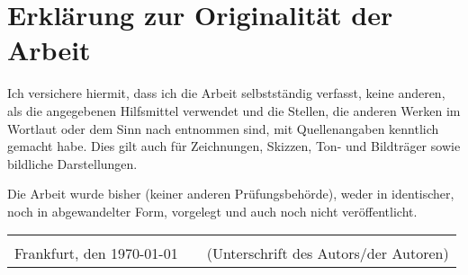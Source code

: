 \chapter*{Erklärung zur Originalität der Arbeit}
Ich versichere hiermit, dass ich die Arbeit selbstständig verfasst, keine anderen, als die angegebenen Hilfsmittel verwendet und die Stellen, die anderen Werken im Wortlaut oder dem Sinn nach entnommen sind, mit Quellenangaben kenntlich gemacht habe. Dies gilt auch für Zeichnungen, Skizzen, Ton- und Bildträger sowie bildliche Darstellungen.

Die Arbeit wurde bisher (keiner anderen Prüfungsbehörde), weder in identischer, noch in abgewandelter Form, vorgelegt und auch noch nicht veröffentlicht.

\vspace{30pt}

\begin{tabular}{@{}p{6cm}p{0.5cm}p{6.5cm}@{}}
	\hrulefill && \hrulefill \\
	Frankfurt, den \today && (Unterschrift des Autors/der Autoren)
\end{tabular}